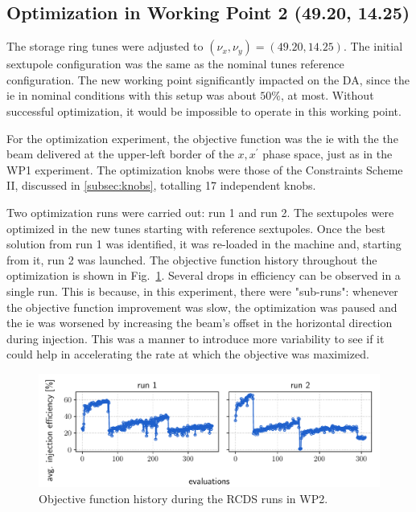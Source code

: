 \subsection{Optimization in Working Point 2 (49.20, 14.25)}
The storage ring tunes were adjusted to $(\nu_x, \nu_y)=(49.20, 14.25)$. The initial sextupole configuration was the same as the nominal tunes reference configuration. The new working point significantly impacted on the \gls*{DA}, since the \gls*{ie} in nominal conditions with this setup was about $50\%$, at most. Without successful optimization, it would be impossible to operate in this working point.

For the optimization experiment, the objective function was the \gls*{ie} with the the beam delivered at the upper-left border of the $x,x^\prime$ phase space, just as in the \gls*{WP1} experiment. The optimization knobs were those of the Constraints Scheme II, discussed in \ref{subsec:knobs}, totalling 17 independent knobs.

Two optimization runs were carried out: run 1 and run 2. The sextupoles were optimized in the new tunes starting with reference sextupoles. Once the best solution from run 1 was identified, it was re-loaded in the machine and, starting from it, run 2 was launched. The objective function history throughout the optimization is shown in Fig.~\ref{fig:wp_2_history}. Several drops in efficiency can be observed in a single run. This is because, in this experiment, there were "sub-runs": whenever the objective function improvement was slow, the optimization was paused and the \gls*{ie} was worsened by increasing the beam's offset in the horizontal direction during injection. This was a manner to introduce more variability to see if it could help in accelerating the rate at which the objective was maximized.
\begin{figure}[htb]
    \includegraphics[width=\columnwidth]{Images/wp2_objfunc_hist.pdf}
    \caption[Objective function history during the RCDS runs in WP2.]{Objective function history during the \gls*{RCDS} runs in \gls*{WP2}.}
    \label{fig:wp_2_history}
\end{figure}
